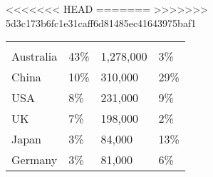 <<<<<<< HEAD
=======
>>>>>>> 5d3c173b6fc1e31caff6d81485ec41643975baf1
\begin{tabular}[t]{p{3cm}>{\hfill}p{1.3cm}>{\hfill}p{1.1cm}>{\hfill}p{1.7cm}}
      &   &     &    \\ 
 Australia & 43\% & 1,278,000 & 3\% \\ 
  China & 10\% &   310,000 & 29\% \\ 
  USA & 8\% &   231,000 & 9\% \\ 
  UK & 7\% &   198,000 & 2\% \\ 
  Japan & 3\% &    84,000 & 13\% \\ 
  Germany & 3\% &    81,000 & 6\% \\ 
  \end{tabular}
